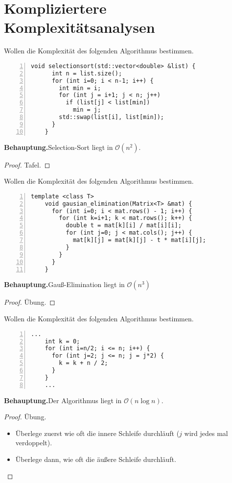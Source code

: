 \documentclass[aspectratio=169]{beamer}
\begin{document}
\section{Kompliziertere Komplexitätsanalysen}

\begin{frame}[fragile]
  Wollen die Komplexität des folgenden Algorithmus bestimmen.
  \begin{lstlisting}[numbers=left]
    void selectionsort(std::vector<double> &list) {
      int n = list.size();
      for (int i=0; i < n-1; i++) {
        int min = i;
        for (int j = i+1; j < n; j++)
          if (list[j] < list[min])
            min = j;
        std::swap(list[i], list[min]);
      }
    }
  \end{lstlisting}
  \pause
  \textbf{Behauptung.}\quad Selection-Sort liegt in $\mathcal{O}(n^2)$.
  \begin{proof}
    Tafel.
  \end{proof}
\end{frame}

\begin{frame}[fragile]
  Wollen die Komplexität des folgenden Algorithmus bestimmen.
  \begin{lstlisting}[numbers=left]
    template <class T>
    void gausian_elimination(Matrix<T> &mat) {
      for (int i=0; i < mat.rows() - 1; i++) {
        for (int k=i+1; k < mat.rows(); k++) {
          double t = mat[k][i] / mat[i][i];
          for (int j=0; j < mat.cols(); j++) {
            mat[k][j] = mat[k][j] - t * mat[i][j];
          }
        }
      }
    }
  \end{lstlisting}
  \pause
  \textbf{Behauptung.}\quad Gauß-Elimination liegt in $\mathcal{O}(n^3)$
  \begin{proof}
    Übung.
  \end{proof}
\end{frame}

\begin{frame}[fragile]
  Wollen die Komplexität des folgenden Algorithmus bestimmen.
  \begin{lstlisting}[numbers=left]
    ...
    int k = 0;
    for (int i=n/2; i <= n; i++) {
      for (int j=2; j <= n; j = j*2) {
        k = k + n / 2;
      }
    }
    ...
  \end{lstlisting}
  \pause
  \textbf{Behauptung.}\quad Der Algorithmus liegt in $\mathcal{O}(n \log n)$.
  \begin{proof}
    Übung.\\
    \begin{itemize}
    \item Überlege zuerst wie oft die innere Schleife durchläuft ($j$ wird jedes mal verdoppelt).
    \item Überlege dann, wie oft die äußere Schleife durchläuft.
    \end{itemize}
  \end{proof}
\end{frame}
\end{document}
